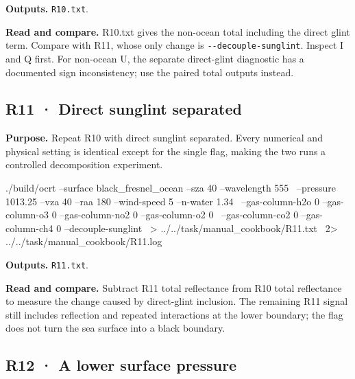 \textbf{Outputs. }\texttt{R10.txt}.

\textbf{Read and compare. }R10.txt gives the non-ocean total including the direct glint term. Compare with R11, whose only change is \texttt{-\allowbreak{}-\allowbreak{}decouple-\allowbreak{}sunglint}. Inspect I and Q first. For non-ocean U, the separate direct-glint diagnostic has a documented sign inconsistency; use the paired total outputs instead.


\subsection{R11 · Direct sunglint separated}
\label{sec:auto:09_cookbook:3.5}

\label{recipe:R11}

\textbf{Purpose. }Repeat R10 with direct sunglint separated. Every numerical and physical setting is identical except for the single flag, making the two runs a controlled decomposition experiment.

\noindent\begin{minipage}{\linewidth}
\begin{ManualCode}

./build/ocrt --surface black_fresnel_ocean --sza 40 --wavelength 555 \
  --pressure 1013.25 --vza 40 --raa 180 --wind-speed 5 --n-water 1.34 \
  --gas-column-h2o 0 --gas-column-o3 0 --gas-column-no2 0 --gas-column-o2 0 \
  --gas-column-co2 0 --gas-column-ch4 0 --decouple-sunglint \
  > ../../task/manual_cookbook/R11.txt \
  2> ../../task/manual_cookbook/R11.log

\end{ManualCode}
\end{minipage}\par

\textbf{Outputs. }\texttt{R11.txt}.

\textbf{Read and compare. }Subtract R11 total reflectance from R10 total reflectance to measure the change caused by direct-glint inclusion. The remaining R11 signal still includes reflection and repeated interactions at the lower boundary; the flag does not turn the sea surface into a black boundary.


\subsection{R12 · A lower surface pressure}
\label{sec:auto:09_cookbook:3.6}

